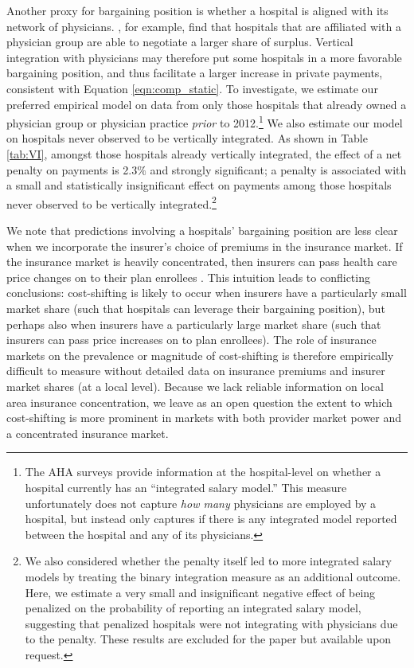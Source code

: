 \documentclass[12pt]{article}
\begin{document}
Another proxy for bargaining position is whether a hospital is aligned with its network of physicians. \cite{lewis2015}, for example, find that hospitals that are affiliated with a physician group are able to negotiate a larger share of surplus. Vertical integration with physicians may therefore put some hospitals in a more favorable bargaining position, and thus facilitate a larger increase in private payments, consistent with Equation \ref{eqn:comp_static}. To investigate, we estimate our preferred empirical model on data from only those hospitals that already owned a physician group or physician practice \textit{prior} to 2012.\footnote{The AHA surveys provide information at the hospital-level on whether a hospital currently has an ``integrated salary model.'' This measure unfortunately does not capture \textit{how many} physicians are employed by a hospital, but instead only captures if there is any integrated model reported between the hospital and any of its physicians.} We also estimate our model on hospitals never observed to be vertically integrated.  As shown in Table \ref{tab:VI}, amongst those hospitals already vertically integrated, the effect of a net penalty on payments is 2.3$\%$ and strongly significant; a penalty is associated with a small and statistically insignificant effect on payments among those hospitals never observed to be vertically integrated.\footnote{We also considered whether the penalty itself led to more integrated salary models by treating the binary integration measure as an additional outcome. Here, we estimate a very small and insignificant negative effect of being penalized on the probability of reporting an integrated salary model, suggesting that penalized hospitals were not integrating with physicians due to the penalty. These results are excluded for the paper but available upon request.}

We note that predictions involving a hospitals' bargaining position are less clear when we incorporate the insurer's choice of premiums in the insurance market. If the insurance market is heavily concentrated, then insurers can pass health care price changes on to their plan enrollees \citep{trish2015,ho2017}. This intuition leads to conflicting conclusions: cost-shifting is likely to occur when insurers have a particularly small market share (such that hospitals can leverage their bargaining position), but perhaps also when insurers have a particularly large market share (such that insurers can pass price increases on to plan enrollees). The role of insurance markets on the prevalence or magnitude of cost-shifting is therefore empirically difficult to measure without detailed data on insurance premiums and insurer market shares (at a local level). Because we lack reliable information on local area insurance concentration, we leave as an open question the extent to which cost-shifting is more prominent in markets with both provider market power and a concentrated insurance market.
\end{document}

